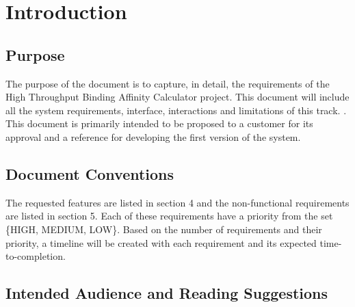 \documentclass{scrreprt}
\begin{document}
\chapter{Introduction}

\section{Purpose}

The purpose of the document is to capture, in detail, the requirements of the High Throughput Binding Affinity Calculator  project. This document will include all the system requirements, interface, interactions and limitations of this track. . This document is primarily intended to be proposed to a customer for its approval
and a reference for developing the first version of the system.

\section{Document Conventions}

The requested features are listed in section 4 and the non-functional requirements are listed in section 5. Each of these requirements have a priority from the set \{HIGH, MEDIUM, LOW\}. Based on the number of requirements and their priority, a timeline will be created with each requirement and its expected time-to-completion.

\section{Intended Audience and Reading Suggestions}
\end{document}
